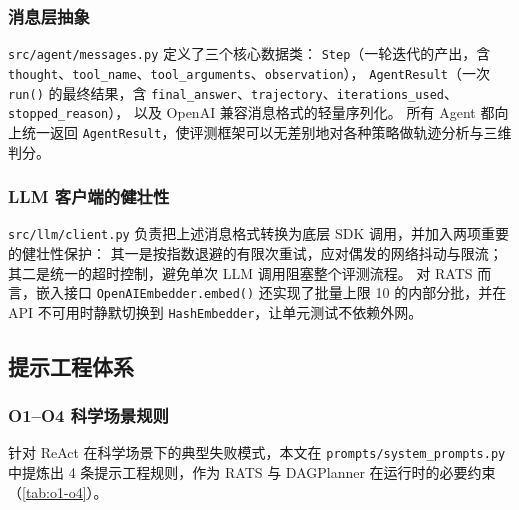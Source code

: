 \subsubsection{消息层抽象}

\texttt{src/agent/messages.py} 定义了三个核心数据类：
\texttt{Step}（一轮迭代的产出，含 \texttt{thought}、\texttt{tool\_name}、\texttt{tool\_arguments}、\texttt{observation}），
\texttt{AgentResult}（一次 \texttt{run()} 的最终结果，含 \texttt{final\_answer}、\texttt{trajectory}、\texttt{iterations\_used}、\texttt{stopped\_reason}），
以及 OpenAI 兼容消息格式的轻量序列化。
所有 Agent 都向上统一返回 \texttt{AgentResult}，使评测框架可以无差别地对各种策略做轨迹分析与三维判分。

\subsubsection{LLM 客户端的健壮性}

\texttt{src/llm/client.py} 负责把上述消息格式转换为底层 SDK 调用，并加入两项重要的健壮性保护：
其一是按指数退避的有限次重试，应对偶发的网络抖动与限流；
其二是统一的超时控制，避免单次 LLM 调用阻塞整个评测流程。
对 RATS 而言，嵌入接口 \texttt{OpenAIEmbedder.embed()} 还实现了批量上限 10 的内部分批，并在 API 不可用时静默切换到 \texttt{HashEmbedder}，让单元测试不依赖外网。

\subsection{提示工程体系}\label{sec:prompt-system}

\subsubsection{O1--O4 科学场景规则}

针对 ReAct 在科学场景下的典型失败模式，本文在 \texttt{prompts/system\_prompts.py} 中提炼出 4 条提示工程规则，作为 RATS 与 DAGPlanner 在运行时的必要约束（\autoref{tab:o1-o4}）。

